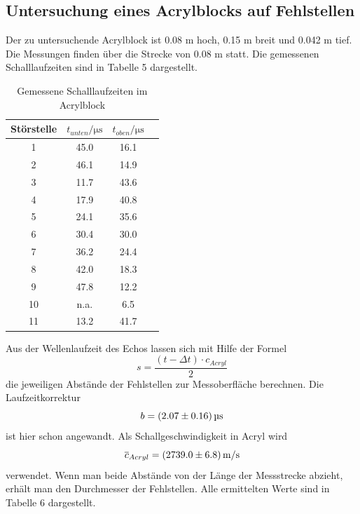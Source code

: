 \documentclass[11pt,ngerman,a4paper]{article}
\begin{document}
\subsection{Untersuchung eines Acrylblocks auf Fehlstellen}
Der zu untersuchende Acrylblock ist 0.08 m hoch, 0.15 m breit und 0.042 m tief. Die Messungen finden über die Strecke von 0.08 m statt. Die gemessenen Schalllaufzeiten sind in Tabelle 5 dargestellt.

\begin{table}[H]
\centering

 \begin{tabular}{cccc}
\toprule
Störstelle  & $t_{unten}/\si{\micro\second}$& $t_{oben}/\si{\micro\second}$\\
\midrule
1 & 45.0 & 16.1  \\
2 & 46.1 & 14.9  \\
3 & 11.7 & 43.6  \\
4 & 17.9 & 40.8  \\
5 & 24.1 & 35.6  \\
6 & 30.4 & 30.0  \\
7 & 36.2 & 24.4  \\
8 & 42.0 & 18.3  \\
9 & 47.8 & 12.2  \\
10 & n.a. & 6.5  \\
11 & 13.2 & 41.7  \\
\bottomrule
\end{tabular}
\caption{Gemessene Schalllaufzeiten im Acrylblock}
\end{table}
\noindent
Aus der Wellenlaufzeit des Echos lassen sich mit Hilfe der Formel
\begin{equation}
s=\frac{(t-\Delta t)\cdot c_{Acryl}}{2}
\end{equation}
die jeweiligen Abstände der Fehlstellen zur Messoberfläche berechnen. Die Laufzeitkorrektur 
\[
b=  \SI{2.07\pm0.16}{\micro\second}
\]
ist hier schon angewandt. Als Schallgeschwindigkeit in Acryl wird 
\[
\overline c_{Acryl}=\SI[per-mode=symbol]{2739.0\pm6.8}{\metre\per\second} 
\]
verwendet. Wenn man beide Abstände von der Länge der Messstrecke abzieht, erhält man den Durchmesser der Fehlstellen.  Alle ermittelten Werte sind in Tabelle 6 dargestellt.
\end{document}
